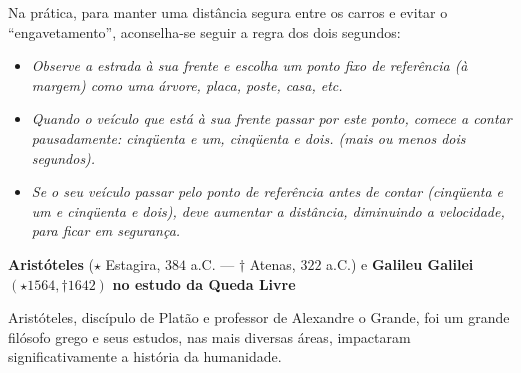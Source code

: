 Na prática, para manter uma distância segura entre os carros e evitar o “engavetamento”, aconselha-se seguir a regra dos dois segundos:
\begin{itemize}
\item {} 
\textit{Observe a estrada à sua frente e escolha um ponto fixo de referência (à margem) como uma árvore, placa, poste, casa, etc.}

\item {} 
\textit{Quando o veículo que está à sua frente passar por este ponto, comece a contar pausadamente: cinqüenta e um, cinqüenta e dois. (mais ou menos dois segundos).}

\item {} 
\textit{Se o seu veículo passar pelo ponto de referência antes de contar (cinqüenta e um e cinqüenta e dois), deve aumentar a distância, diminuindo a velocidade, para ficar em segurança.}

\end{itemize}





\label{\detokenize{AF209-1:sec-org-ideias-galileu-muv}}\label{\detokenize{AF209-1::doc}}\label{\detokenize{AF209-1:organizando-as-ideias-queda-vertical}}
\textbf{Aristóteles} (\(\star\) Estagira, \(384\) a.C. — \(\dagger\) Atenas, \(322\) a.C.) e \textbf{Galileu Galilei} \((\star 1564 , \dagger 1642)\) \textbf{no estudo da Queda Livre}

Aristóteles, discípulo de Platão e professor de Alexandre o Grande, foi um grande filósofo grego e seus estudos, nas mais diversas áreas, impactaram significativamente a história da humanidade.

